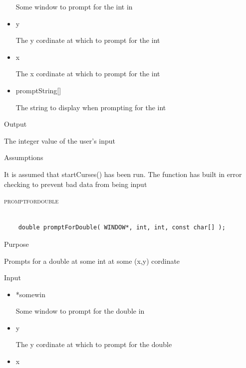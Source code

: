\documentclass[pdftex, 11pt]{article}
\begin{document}
\begin{description}
\begin{description}
\begin{itemize}
						Some window to prompt for the int in

					\item{y}

						The y cordinate at which to prompt
						for the int

					\item{x} 

						The x cordinate at which to prompt
						for the int

					\item{promptString[]}

						The string to display when prompting for
						the int
						
				\end{itemize}

			\item{Output}

				The integer value of the user's input

			\item{Assumptions}

				It is assumed that startCurses() has been run.
				The function has built in error checking to prevent
				bad data from being input

		\end{description}


	\item{\textsc{promptfordouble}}

		\begin{lstlisting}

	double promptForDouble( WINDOW*, int, int, const char[] );
		\end{lstlisting}

		\begin{description}
			\item{Purpose}

				Prompts for a double at some int at some (x,y) cordinate

			\item{Input}

				\begin{itemize}

					\item{*somewin}

						Some window to prompt for the double in

					\item{y}

						The y cordinate at which to prompt
						for the double

					\item{x} 


\end{itemize}
\end{description}
\end{description}
\end{document}
